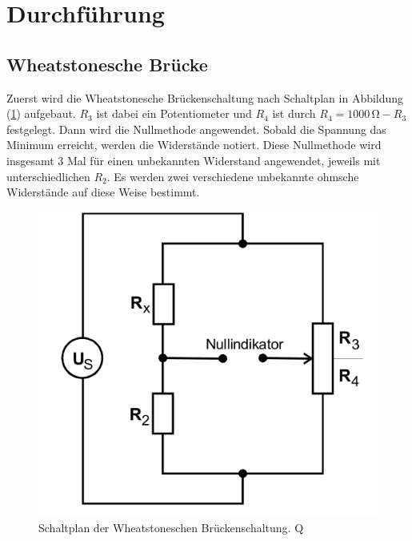 \section{Durchführung}
%
\subsection{Wheatstonesche Brücke}
Zuerst wird die Wheatstonesche Brückenschaltung nach Schaltplan in Abbildung (\ref{pic:Wheatstonesche_Brueckenschaltung}) aufgebaut. $R_3$ ist dabei ein Potentiometer
und $R_4$ ist durch $R_4 = 1000 \, \unit{\ohm} - R_3 $ festgelegt. Dann wird die Nullmethode angewendet.
Sobald die Spannung das Minimum erreicht, werden die Widerstände notiert. Diese Nullmethode wird insgesamt 3 Mal für einen unbekannten Widerstand angewendet, jeweils
mit unterschiedlichen $R_2$. Es werden zwei verschiedene unbekannte ohmsche Widerstände auf diese Weise bestimmt.  
\begin{figure}[H]
    \centering
    \includegraphics[width=0.4\linewidth]{Wheatstonesche.png}
    \caption{Schaltplan der Wheatstoneschen Brückenschaltung. Q\cite{anleitungV302}}
    \label{pic:Wheatstonesche_Brueckenschaltung}
\end{figure}
